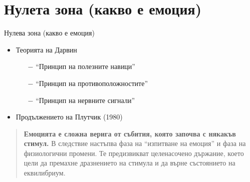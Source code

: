 \documentclass[9pt]{beamer}
\begin{document}
    \section{Нулета зона (какво е емоция)}
    \begin{frame}{Нулева зона (какво е емоция)}
        \begin{itemize}
            \setlength\itemsep{\fill}
            \item Теорията на Дарвин
            \begin{itemize}
                \pause
                \item[$-$] ``Принцип на полезните навици''
                \pause
                \item[$-$] ``Принцип на противоположностите''
                \pause
                \item[$-$] ``Принцип на нервните сигнали''
            \end{itemize}
            \pause
            \item Продължението на Плутчик (1980)
        \end{itemize}
        \pause
        \begin{quote}
            \textbf{Емоцията е сложна верига от събития, която започва с някакъв стимул.} В следствие настъпва фаза на ``изпитване на емоция'' и фаза на физиологични промени. Те предизвикват целенасочено държание, което цели да премахне дразнението на стимула и да върне състоянието на еквилибриум.
        \end{quote}
    \end{frame}
\end{document}
